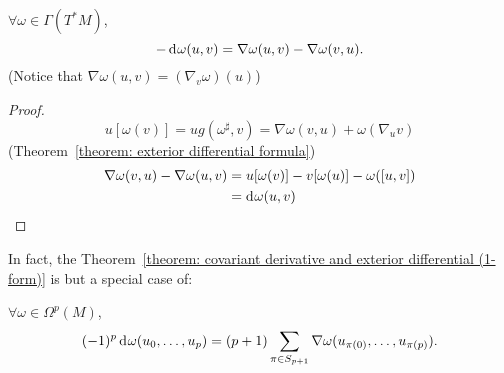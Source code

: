 \documentclass[openany, oneside, a5paper]{book}
\begin{document}
\begin{theorem}\label{theorem: covariant derivative and exterior differential (1-form)}
    $\forall \omega \in \Gamma(T^*M)$,
    \begin{equation}
        - \mathop{}\!\mathrm{d}^{} \omega(u, v) = \nabla \omega(u, v) - \nabla\omega(v, u).
    \end{equation}
    (Notice that $\nabla \omega(u, v) = (\nabla_v \omega) (u)$)
\end{theorem}
\begin{proof}
    \begin{equation}
        u[\omega(v)] = u g(\omega^\sharp, v) = \nabla \omega(v, u) + \omega(\nabla_u v)
    \end{equation}
    \hence (Theorem~\ref{theorem: exterior differential formula})
    \begin{align}
        \nabla \omega(v, u) - \nabla \omega (u, v) 
        &= u[\omega(v)] - v[\omega(u)] - \omega([u, v])
        \\
        &= \mathop{}\!\mathrm{d}^{} \omega(u, v)
    \end{align}
\end{proof}

In fact, the Theorem~\ref{theorem: covariant derivative and exterior differential (1-form)} is but a special case of:
\begin{theorem}\label{theorem: covariant derivative and exterior differential}
    $\forall \omega \in \Omega^p(M)$,
    \begin{equation}
        (-1)^p \mathop{}\!\mathrm{d}^{} \omega(u_0, \ldots, u_p) = 
        (p + 1) \sum_{\pi \in S_{p + 1}} \nabla \omega (u_{\pi(0)}, \ldots, u_{\pi(p)}).
    \end{equation}
    
\end{theorem}



\backmatter{}
\nocite{*} %
\printbibliography[heading=bibliography, title={bibliography}]

\printindex[symbol]

\printindex
\end{document}
